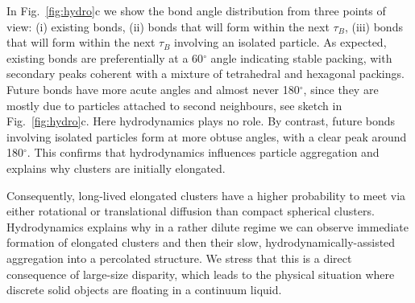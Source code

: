\documentclass[footinbib,amsmath,amssymb,superscriptaddress,twocolumn]{revtex4}
\begin{document}
In Fig.~\ref{fig:hydro}c we show the bond angle distribution from three points of view: (i) existing bonds, (ii) bonds that will form within the next $\tau_B$, (iii) bonds that will form within the next $\tau_B$ involving an isolated particle. As expected, existing bonds are preferentially at a 60$^\circ$ angle indicating stable packing, with secondary peaks coherent with a mixture of tetrahedral and hexagonal packings. Future bonds have more acute angles and almost never 180$^\circ$, since they are mostly due to particles attached to second neighbours, see sketch in Fig.~\ref{fig:hydro}c. Here hydrodynamics plays no role. By contrast, future bonds involving isolated particles form at more obtuse angles, with a clear peak around 180$^\circ$. This confirms that hydrodynamics influences particle aggregation and explains why clusters are initially elongated.

Consequently, long-lived elongated clusters have a higher probability to meet via either rotational or translational diffusion than compact spherical clusters. 
Hydrodynamics explains why in a rather dilute regime we can observe immediate formation of elongated clusters and then their slow, hydrodynamically-assisted aggregation into a percolated structure.
We stress that this is a direct consequence of large-size disparity, which leads to the physical situation where discrete solid objects are floating in a continuum liquid. 
\end{document}
